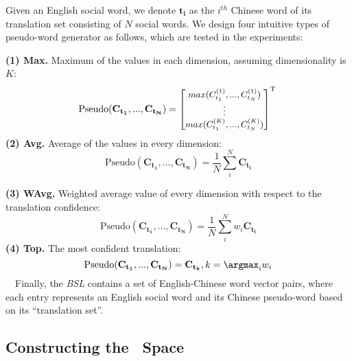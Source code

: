 Given an English social word, we denote $\mathbf{t_i}$ as the $i^{th}$ Chinese word of its translation set consisting of $N$ social words.
We design four intuitive types of pseudo-word generator as follows, which are tested in the experiments:

\noindent
\textbf{(1) Max.} Maximum of the values in each dimension, assuming dimensionality is $K$:
{\begin{equation*}
	\text{Pseudo}(\mathbf{C_{t_1}},...,\mathbf{C_{t_N}}) = \small \begin{bmatrix}
	max(C_{t_1}^{(1)},...,C_{t_N}^{(1)}) \\
	\vdots   \\
	max(C_{t_1}^{(K)},...,C_{t_N}^{(K)})
	\end{bmatrix}^{\rm T} \\
\end{equation*}}%
\noindent
\textbf{(2) Avg.} Average of the values in every dimension:
{$$\text{Pseudo}(\mathbf{C_{t_1}},...,\mathbf{C_{t_N}})=\frac{1}{N}\sum_i^N\mathbf{C_{t_i}} $$}

\noindent
\textbf{(3) WAvg.} Weighted average value of every dimension 
with respect to the translation confidence:
{$$\text{Pseudo}(\mathbf{C_{t_1}},...,\mathbf{C_{t_N}})=\frac{1}{N}\sum_i^Nw_i \mathbf{C_{t_i}} $$}
\noindent
\textbf{(4) Top.} The most confident translation:
{$$	\text{Pseudo}(\mathbf{C_{t_1}},...,\mathbf{C_{t_N}}) = \mathbf{C_{t_k}}, \text{} k = \argmax_i{w_i} $$}
~~Finally, the \textit{BSL} contains a set of English-Chinese word vector pairs, where each entry represents an English social word and its Chinese pseudo-word based on its ``translation set''.


\subsection{Constructing the {\socvec}~Space}
\label{sec:pg}

